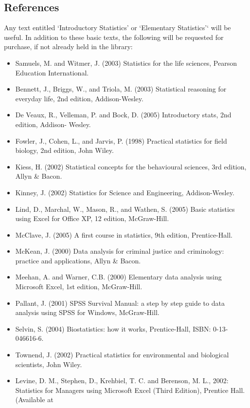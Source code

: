 \documentclass[a4paper,oneside]{book}
\begin{document}
\subsection*{References}
Any text entitled `Introductory Statistics' or `Elementary Statistics'` will be useful. In addition to
these basic texts, the following will be requested for purchase, if not already held in the library:
\begin{itemize}
\item Samuels, M. and Witmer, J. (2003) Statistics for the life sciences, Pearson Education
        International.
\item Bennett, J., Briggs, W., and Triola, M. (2003) Statistical reasoning for everyday life, 2nd edition,
        Addison-Wesley.
\item De Veaux, R., Velleman, P. and Bock, D. (2005) Introductory stats, 2nd edition, Addison-
        Wesley.
\item Fowler, J., Cohen, L., and Jarvis, P. (1998) Practical statistics for field biology, 2nd edition, John
        Wiley.
\item   Kiess, H. (2002) Statistical concepts for the behavioural sciences, 3rd edition, Allyn \& Bacon.
\item   Kinney, J. (2002) Statistics for Science and Engineering, Addison-Wesley.
\item   Lind, D., Marchal, W., Mason, R., and Wathen, S. (2005) Basic statistics using Excel for Office
  XP, 12 edition, McGraw-Hill.
\item   McClave, J. (2005) A first course in statistics, 9th edition, Prentice-Hall.
\item   McKean, J. (2000) Data analysis for criminal justice and criminology: practice and applications, Allyn
  \& Bacon.
\item   Meehan, A. and Warner, C.B. (2000) Elementary data analysis using Microsoft Excel, 1st edition,
  McGraw-Hill.
\item   Pallant, J. (2001) SPSS Survival Manual: a step by step guide to data analysis using SPSS for
  Windows, McGraw-Hill.
\item   Selvin, S. (2004) Biostatistics: how it works, Prentice-Hall, ISBN: 0-13-046616-6.
\item   Townend, J. (2002) Practical statistics for environmental and biological scientists, John Wiley.
\item   Levine, D. M., Stephen, D., Krehbiel, T. C. and Berenson, M. L., 2002: Statistics for
  Managers using Microsoft Excel (Third Edition), Prentice Hall. (Available at

\end{itemize}
\end{document}
